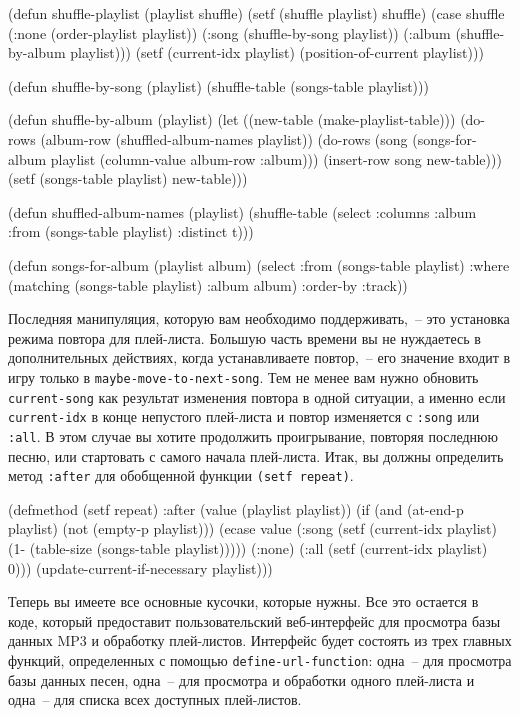 \begin{myverb}
(defun shuffle-playlist (playlist shuffle)
  (setf (shuffle playlist) shuffle)
  (case shuffle
    (:none (order-playlist playlist))
    (:song (shuffle-by-song playlist))
    (:album (shuffle-by-album playlist)))
  (setf (current-idx playlist) (position-of-current playlist)))

(defun shuffle-by-song (playlist)
  (shuffle-table (songs-table playlist)))

(defun shuffle-by-album (playlist)
  (let ((new-table (make-playlist-table)))
    (do-rows (album-row (shuffled-album-names playlist))
      (do-rows (song (songs-for-album playlist (column-value album-row :album)))
        (insert-row song new-table)))
    (setf (songs-table playlist) new-table)))

(defun shuffled-album-names (playlist)
  (shuffle-table 
   (select
    :columns :album
    :from (songs-table playlist)
    :distinct t)))

(defun songs-for-album (playlist album)
  (select
   :from (songs-table playlist) 
   :where (matching (songs-table playlist) :album album)
   :order-by :track))
\end{myverb}

Последняя манипуляция, которую вам необходимо поддерживать,~-- это установка режима
повтора для плей-листа. Большую часть времени вы не нуждаетесь в дополнительных действиях,
когда устанавливаете повтор,~-- его значение входит в игру только в
\lstinline{maybe-move-to-next-song}.  Тем не менее вам нужно обновить
\lstinline{current-song} как результат изменения повтора в одной ситуации, а именно если
\lstinline{current-idx} в конце непустого плей-листа и повтор изменяется с
\lstinline{:song} или \lstinline{:all}. В этом случае вы хотите продолжить проигрывание,
повторяя последнюю песню, или стартовать с самого начала плей-листа. Итак, вы должны
определить метод \lstinline{:after} для обобщенной функции \lstinline{(setf repeat)}.

\begin{myverb}
(defmethod (setf repeat) :after (value (playlist playlist))
  (if (and (at-end-p playlist) (not (empty-p playlist)))
    (ecase value
      (:song (setf (current-idx playlist) (1- (table-size (songs-table playlist)))))
      (:none)
      (:all  (setf (current-idx playlist) 0)))
    (update-current-if-necessary playlist)))
\end{myverb}

Теперь вы имеете все основные кусочки, которые нужны. Все это остается в коде, который
предоставит пользовательский веб-интерфейс для просмотра базы данных MP3 и обработку
плей-листов. Интерфейс будет состоять из трех главных функций, определенных с помощью
\lstinline{define-url-function}: одна~-- для просмотра базы данных песен, одна~-- для просмотра и
обработки одного плей-листа и одна~-- для списка всех доступных плей-листов.

